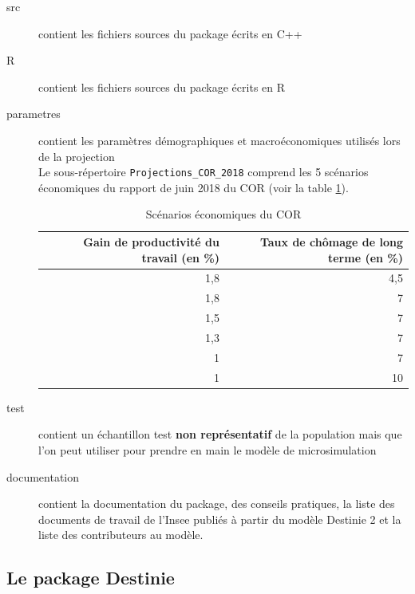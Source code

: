 	\begin{description}
		\item[src] contient les fichiers sources du package écrits en C++
		\item[R] contient les fichiers sources du package écrits en R
		\item[parametres] contient les paramètres démographiques et macroéconomiques utilisés lors de la projection\\
Le sous-répertoire {\tt Projections\_COR\_2018} comprend les 5 scénarios économiques du rapport de juin 2018 du COR (voir la table \ref{tab:hypscCOR}). 
\renewcommand{\arraystretch}{1.8}

\begin{table}[h]
  \centering
  \caption{Scénarios économiques du COR}
    \begin{tabular}{rr}
    \toprule
 Gain de productivité du travail (en \%) & Taux de chômage de long terme (en \%) \\
    \midrule
 1,8     & 4,5 \\
 1,8   & 7 \\
 1,5   & 7 \\
 1,3   & 7 \\
 1     & 7 \\
 1     & 10 \\
    \bottomrule
    \end{tabular}%
  \label{tab:hypscCOR}%
\end{table}%
		\item[test] contient un échantillon test \textbf{non représentatif} de la population mais que l'on peut utiliser pour prendre en main le modèle de microsimulation
		\item[documentation] contient la documentation du package, des conseils pratiques, la liste des documents de travail de l'Insee publiés à partir du modèle Destinie 2 et la liste des contributeurs au modèle.
	\end{description}






\subsection{Le package Destinie}


